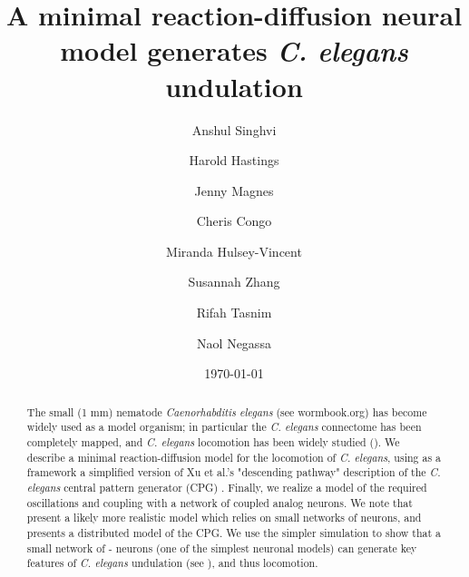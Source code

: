 \documentclass[
    11pt,
]{article}
\begin{document}


\title{A minimal reaction-diffusion neural model generates {\emph{C. elegans}} undulation}

\author[1]{Anshul Singhvi}

\author[1,3]{Harold Hastings}

\author[2]{Jenny Magnes}

\author[2]{Cheris Congo}

\author[2]{Miranda Hulsey-Vincent}

\author[2]{Susannah Zhang} 

\author[1]{Rifah Tasnim}

\author[1]{Naol Negassa}


\date{\today}

\begin{abstract}

    The small (1 mm) nematode \emph{Caenorhabditis elegans} (see wormbook.org) has become widely used as a model organism; in particular the \emph{C. elegans} connectome has been completely mapped, and \emph{C. elegans} locomotion has been widely studied (\citet{corsi2015}). We describe a minimal reaction-diffusion model for the locomotion of \emph{C. elegans}, using as a framework a simplified version of Xu et al.'s "descending pathway" description of the \emph{C. elegans} central pattern generator (CPG) \citet{xu2018,wen2012}.  Finally, we realize a model of the required oscillations and coupling with a network of coupled \citet{keener1983} analog neurons.
    We note that \citet{olivares2019} present a likely more realistic model which relies on small networks of neurons, and presents a distributed model of the CPG. We use the simpler simulation to show that a small network of \citet{fitzhugh1955}-\citet{nagumo1962} neurons (one of the simplest neuronal models) can generate key features of \emph{C. elegans} undulation (see \citet{magnes2012}), and thus locomotion.
\end{abstract}

\maketitle
\end{document}
